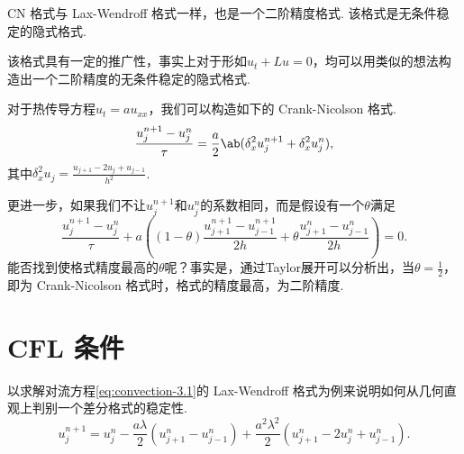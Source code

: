 CN 格式与 Lax-Wendroff 格式一样，也是一个二阶精度格式. 该格式是无条件稳定的隐式格式.\par

该格式具有一定的推广性，事实上对于形如$u_t+Lu=0$，均可以用类似的想法构造出一个二阶精度的无条件稳定的隐式格式.

\begin{instance}
    对于热传导方程$u_t=a u_{xx}$，我们可以构造如下的 Crank-Nicolson 格式.
    \begin{equation*}
        \frac{u^{n+1}_j-u^n_j}{\tau}=\frac{a}{2}\ab(\delta^2_x u^{n+1}_j+\delta^2_x u^n_j),
    \end{equation*}
    其中$\delta_x^2u_j=\frac{u_{j+1}-2u_j+u_{j-1}}{h^2}$.
\end{instance}

更进一步，如果我们不让$u_j^{n+1}$和$u_j^n$的系数相同，而是假设有一个$\theta$满足
\begin{equation*}
    \frac{u_j^{n+1} - u_j^n}{\tau} + a\left((1-\theta) \frac{u_{j+1}^{n+1} - u_{j-1}^{n+1}}{2h} + \theta\frac{u_{j+1}^n - u_{j-1}^n}{2h} \right) = 0.
\end{equation*}
能否找到使格式精度最高的$\theta$呢？事实是，通过Taylor展开可以分析出，当$\theta=\frac{1}{2}$，即为 Crank-Nicolson 格式时，格式的精度最高，为二阶精度.



\section{CFL 条件}

以求解对流方程\eqref{eq:convection-3.1}的 Lax-Wendroff 格式为例来说明如何从几何直观上判别一个差分格式的稳定性.
\begin{equation*}
    u_j^{n+1} = u_j^n - \frac{a\lambda}{2}(u_{j+1}^n - u_{j-1}^n) + \frac{a^2\lambda^2}{2}(u_{j+1}^n - 2u_j^n + u_{j-1}^n).
\end{equation*}

